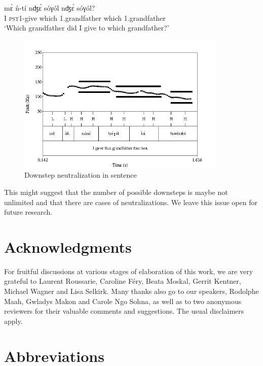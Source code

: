 \documentclass[output=paper,newtxmath,modfonts,nonflat]{langsci/langscibook}
\begin{document}
\ea \gll m\`ɛ ǹ-tí nʤ\'ɛ {\textdownstep}sóγól nʤ\'ɛ {\textdownstep}sóγól?\\
I \textsc{pst1}-give which 1.grandfather which 1.grandfather\\
\glt `Which grandfather did I give to which grandfather?'\label{ex:HamlaouiMakasso:28} 
\z

\begin{figure}

\caption{Downstep neutralization in sentence }
\label{fig:HamlaouiMakasso:9}
\includegraphics[width=10cm]{figures/NeutralizationSept16B}

\end{figure}

\noindent This might suggest that the number of possible downsteps is maybe not unlimited and that there are cases of neutralizations. We leave this issue open for future research.


\section*{Acknowledgments}

For fruitful discussions at various stages of elaboration of this work, we are very grateful to Laurent Roussarie, Caroline Féry, Beata Moskal, Gerrit Kentner, Michael Wagner and Lisa Selkirk. Many thanks also go to our speakers, Rodolphe Maah, Gwladys Makon and Carole Ngo Sohna, as well as to two anonymous reviewers for their valuable comments and suggestions. The usual disclaimers apply.

\section*{Abbreviations}
\end{document}
